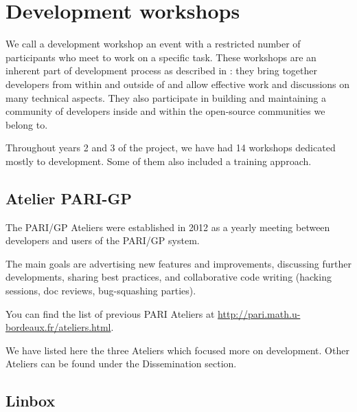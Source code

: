 \documentclass{deliverablereport}
\author{Viviane Pons et al.}
\begin{document}
\enlargethispage{4ex}
\maketitle
\githubissuedescription
\tableofcontents
\newpage


\section{Development workshops}

We call a development workshop an event with a restricted number of participants
who meet to work on a specific task. These workshops are an inherent part
of \ODK development process as described in :
 they bring together
developers from within and outside of \ODK and allow effective work
and discussions on many technical aspects. They also participate in building
and maintaining a community of developers inside \ODK and within the
open-source communities we belong to.

Throughout years 2 and 3 of the project, we have had 14 workshops dedicated mostly
to development. Some of them also included a training approach. 

\subsection{Atelier PARI-GP}

The PARI/GP Ateliers were established in 2012 as a yearly meeting
between developers and users of the PARI/GP system.

The main goals are advertising new features and improvements,
discussing further developments, sharing best practices, and collaborative
code writing (hacking sessions, doc reviews, bug-squashing parties).

You can find the list of previous PARI Ateliers at
\url{http://pari.math.u-bordeaux.fr/ateliers.html}.

We have listed here the three Ateliers which focused more on development. 
Other Ateliers can be found under the Dissemination section.







\subsection{Linbox}
\end{document}
